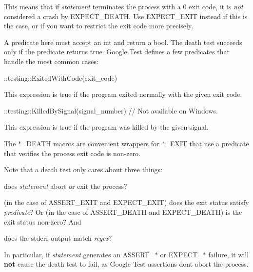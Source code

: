 This means that if {\itshape statement} terminates the process with a 0 exit code, it is {\itshape not} considered a crash by {\ttfamily E\+X\+P\+E\+C\+T\+\_\+\+D\+E\+A\+TH}. Use {\ttfamily E\+X\+P\+E\+C\+T\+\_\+\+E\+X\+IT} instead if this is the case, or if you want to restrict the exit code more precisely.

A predicate here must accept an {\ttfamily int} and return a {\ttfamily bool}. The death test succeeds only if the predicate returns {\ttfamily true}. Google Test defines a few predicates that handle the most common cases\+:


\begin{DoxyCode}
::testing::ExitedWithCode(exit\_code)
\end{DoxyCode}


This expression is {\ttfamily true} if the program exited normally with the given exit code.


\begin{DoxyCode}
::testing::KilledBySignal(signal\_number)  // Not available on Windows.
\end{DoxyCode}


This expression is {\ttfamily true} if the program was killed by the given signal.

The {\ttfamily $\ast$\+\_\+\+D\+E\+A\+TH} macros are convenient wrappers for {\ttfamily $\ast$\+\_\+\+E\+X\+IT} that use a predicate that verifies the process\textquotesingle{} exit code is non-\/zero.

Note that a death test only cares about three things\+:


\begin{DoxyEnumerate}
\item does {\itshape statement} abort or exit the process?
\end{DoxyEnumerate}
\begin{DoxyEnumerate}
\item (in the case of {\ttfamily A\+S\+S\+E\+R\+T\+\_\+\+E\+X\+IT} and {\ttfamily E\+X\+P\+E\+C\+T\+\_\+\+E\+X\+IT}) does the exit status satisfy {\itshape predicate}? Or (in the case of {\ttfamily A\+S\+S\+E\+R\+T\+\_\+\+D\+E\+A\+TH} and {\ttfamily E\+X\+P\+E\+C\+T\+\_\+\+D\+E\+A\+TH}) is the exit status non-\/zero? And
\end{DoxyEnumerate}
\begin{DoxyEnumerate}
\item does the stderr output match {\itshape regex}?
\end{DoxyEnumerate}

In particular, if {\itshape statement} generates an {\ttfamily A\+S\+S\+E\+R\+T\+\_\+$\ast$} or {\ttfamily E\+X\+P\+E\+C\+T\+\_\+$\ast$} failure, it will {\bfseries not} cause the death test to fail, as Google Test assertions don\textquotesingle{}t abort the process.

